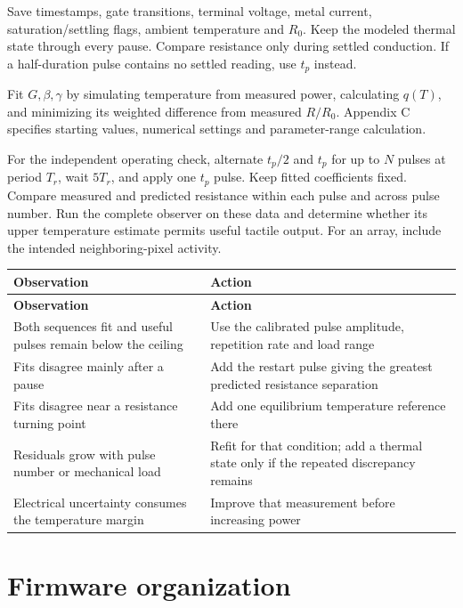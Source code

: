 \documentclass[11pt,letterpaper]{article}
\newlength{\TableWidth}
\begin{document}
Save timestamps, gate transitions, terminal voltage, metal current, saturation/settling flags, ambient temperature and \(R_0\). Keep the modeled thermal state through every pause. Compare resistance only during settled conduction. If a half-duration pulse contains no settled reading, use \(t_p\) instead.

Fit \(G,\beta,\gamma\) by simulating temperature from measured power, calculating \(q(T)\), and minimizing its weighted difference from measured \(R/R_0\). Appendix C specifies starting values, numerical settings and parameter-range calculation.

For the independent operating check, alternate \(t_p/2\) and \(t_p\) for up to \(N\) pulses at period \(T_r\), wait \(5T_r\), and apply one \(t_p\) pulse. Keep fitted coefficients fixed. Compare measured and predicted resistance within each pulse and across pulse number. Run the complete observer on these data and determine whether its upper temperature estimate permits useful tactile output. For an array, include the intended neighboring-pixel activity.

\begingroup
\small
\setlength{\tabcolsep}{5pt}
\renewcommand{\arraystretch}{1.14}
\setlength{\TableWidth}{\dimexpr\linewidth-2\tabcolsep\relax}
\begin{longtable}{@{}L{0.440\TableWidth}L{0.560\TableWidth}@{}}
\toprule
\textbf{Observation} & \textbf{Action} \\
\midrule
\endfirsthead
\toprule
\textbf{Observation} & \textbf{Action} \\
\midrule
\endhead
\midrule
\endfoot
\bottomrule
\endlastfoot
Both sequences fit and useful pulses remain below the ceiling & Use the calibrated pulse amplitude, repetition rate and load range \\
Fits disagree mainly after a pause & Add the restart pulse giving the greatest predicted resistance separation \\
Fits disagree near a resistance turning point & Add one equilibrium temperature reference there \\
Residuals grow with pulse number or mechanical load & Refit for that condition; add a thermal state only if the repeated discrepancy remains \\
Electrical uncertainty consumes the temperature margin & Improve that measurement before increasing power \\
\end{longtable}
\endgroup


\section{Firmware organization}
\end{document}
